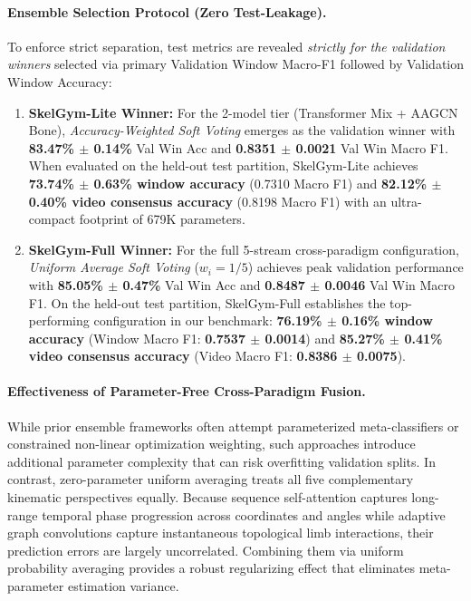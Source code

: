 \documentclass[runningheads]{llncs}
\begin{document}
\paragraph{Ensemble Selection Protocol (Zero Test-Leakage).} To enforce strict separation, test metrics are revealed \textit{strictly for the validation winners} selected via primary Validation Window Macro-F1 followed by Validation Window Accuracy:
\begin{enumerate}
    \item \textbf{SkelGym-Lite Winner:} For the 2-model tier (Transformer Mix + AAGCN Bone), \textit{Accuracy-Weighted Soft Voting} emerges as the validation winner with \textbf{83.47\% $\pm$ 0.14\%} Val Win Acc and \textbf{0.8351 $\pm$ 0.0021} Val Win Macro F1. When evaluated on the held-out test partition, SkelGym-Lite achieves \textbf{73.74\% $\pm$ 0.63\% window accuracy} (0.7310 Macro F1) and \textbf{82.12\% $\pm$ 0.40\% video consensus accuracy} (0.8198 Macro F1) with an ultra-compact footprint of 679K parameters.
    \item \textbf{SkelGym-Full Winner:} For the full 5-stream cross-paradigm configuration, \textit{Uniform Average Soft Voting} ($w_i = 1/5$) achieves peak validation performance with \textbf{85.05\% $\pm$ 0.47\%} Val Win Acc and \textbf{0.8487 $\pm$ 0.0046} Val Win Macro F1. On the held-out test partition, SkelGym-Full establishes the top-performing configuration in our benchmark: \textbf{76.19\% $\pm$ 0.16\% window accuracy} (Window Macro F1: \textbf{0.7537 $\pm$ 0.0014}) and \textbf{85.27\% $\pm$ 0.41\% video consensus accuracy} (Video Macro F1: \textbf{0.8386 $\pm$ 0.0075}).
\end{enumerate}

\paragraph{Effectiveness of Parameter-Free Cross-Paradigm Fusion.}
While prior ensemble frameworks often attempt parameterized meta-classifiers or constrained non-linear optimization weighting, such approaches introduce additional parameter complexity that can risk overfitting validation splits. In contrast, zero-parameter uniform averaging treats all five complementary kinematic perspectives equally. Because sequence self-attention captures long-range temporal phase progression across coordinates and angles while adaptive graph convolutions capture instantaneous topological limb interactions, their prediction errors are largely uncorrelated. Combining them via uniform probability averaging provides a robust regularizing effect that eliminates meta-parameter estimation variance.
\end{document}
